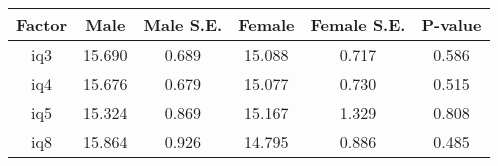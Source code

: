 \begin{longtable}{c c c c c c}
\toprule
\textbf{Factor} & \textbf{Male} & \textbf{Male S.E.}  & \textbf{Female} & \textbf{Female S.E.} & \textbf{P-value} \\
\midrule
iq3 & 15.690 & 0.689 &  15.088 & 0.717 & 0.586 \\
iq4 & 15.676 & 0.679 &  15.077 & 0.730 & 0.515 \\
iq5 & 15.324 & 0.869 &  15.167 & 1.329 & 0.808 \\
iq8 & 15.864 & 0.926 &  14.795 & 0.886 & 0.485 \\
\bottomrule
\end{longtable}
